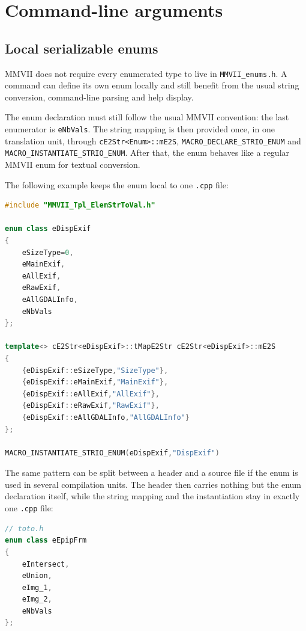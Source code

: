 
\chapter{Command-line arguments}

\section{Local serializable enums}

MMVII does not require every enumerated type to live in
\texttt{MMVII\_enums.h}.  A command can define its own enum locally and still
benefit from the usual string conversion, command-line parsing and help display.

The enum declaration must still follow the usual MMVII convention: the last
enumerator is \texttt{eNbVals}.  The string mapping is then provided once, in one
translation unit, through \texttt{cE2Str<Enum>::mE2S},
\texttt{MACRO\_DECLARE\_STRIO\_ENUM} and
\texttt{MACRO\_INSTANTIATE\_STRIO\_ENUM}.  After that, the enum behaves like a
regular MMVII enum for textual conversion.

The following example keeps the enum local to one \texttt{.cpp} file:

\begin{lstlisting}[language=C++]
#include "MMVII_Tpl_ElemStrToVal.h"

enum class eDispExif
{
    eSizeType=0,
    eMainExif,
    eAllExif,
    eRawExif,
    eAllGDALInfo,
    eNbVals
};

template<> cE2Str<eDispExif>::tMapE2Str cE2Str<eDispExif>::mE2S
{
    {eDispExif::eSizeType,"SizeType"},
    {eDispExif::eMainExif,"MainExif"},
    {eDispExif::eAllExif,"AllExif"},
    {eDispExif::eRawExif,"RawExif"},
    {eDispExif::eAllGDALInfo,"AllGDALInfo"}
};

MACRO_INSTANTIATE_STRIO_ENUM(eDispExif,"DispExif")
\end{lstlisting}

The same pattern can be split between a header and a source file if the enum is
used in several compilation units.  The header then carries nothing but the enum
declaration itself, while the string mapping and the instantiation stay in exactly
one \texttt{.cpp} file:

\begin{lstlisting}[language=C++]
// toto.h
enum class eEpipFrm
{
    eIntersect,
    eUnion,
    eImg_1,
    eImg_2,
    eNbVals
};
\end{lstlisting}


